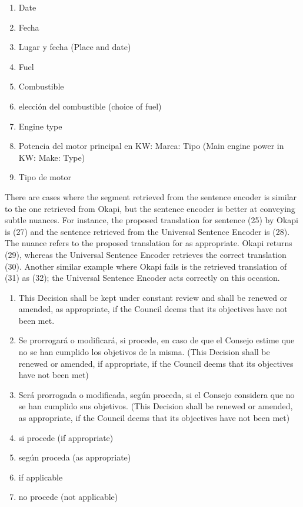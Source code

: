 \begin{enumerate}[resume,label={(\arabic*)}]
		\item	Date
		\item	Fecha
		\item	Lugar y fecha (Place and date)
		\item	Fuel
		\item	Combustible
		\item	elección del combustible (choice of fuel)
		\item	Engine type
		\item	Potencia del motor principal en KW: Marca: Tipo (Main engine power in KW: Make: Type)
		\item	Tipo de motor
	
\end{enumerate}

There are cases where the segment retrieved from the sentence encoder is similar to the one retrieved from Okapi, but the sentence encoder is better at conveying subtle nuances. For instance, the proposed translation for sentence (25) by Okapi is (27) and the sentence retrieved from the Universal Sentence Encoder is (28). The nuance refers to the proposed translation for as appropriate. Okapi returns (29), whereas the Universal Sentence Encoder retrieves the correct translation (30). Another similar example where Okapi fails is the retrieved translation of (31) as (32); the Universal Sentence Encoder acts correctly on this occasion. 

\begin{enumerate}[resume,label={(\arabic*)}]
	\item	This Decision shall be kept under constant review and shall be renewed or amended, as appropriate, if the Council deems that its objectives have not been met.
	\item	Se prorrogará o modificará, si procede, en caso de que el Consejo estime que no se han cumplido los objetivos de la misma. (This Decision shall be renewed or amended, if appropriate, if the Council deems that its objectives have not been met)
	\item	Será prorrogada o modificada, según proceda, si el Consejo considera que no se han cumplido sus objetivos. (This Decision shall be renewed or amended, as appropriate, if the Council deems that its objectives have not been met)
	\item	si procede (if appropriate)
	\item	según proceda (as appropriate)
	\item	if applicable
	\item	no procede (not applicable)
\end{enumerate}

